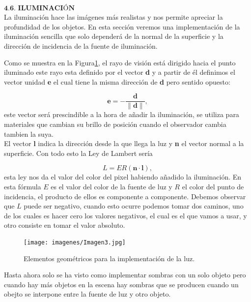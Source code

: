 ${ }$\\
$\textbf{4.6. ILUMINACIÓN}$
${ }$\\

La iluminación hace las imágenes más realistas y nos permite apreciar la profundidad de los objetos. En esta sección veremos una implementación de la iluminación sencilla que solo dependerá de la normal de la superficie y la dirección de incidencia de la fuente de iluminación. 


Como se muestra en la Figura\ref{fig:etiq_5}, el rayo de visión está dirigido hacia el punto iluminado este rayo esta definido por el vector \textbf{d} y a partir de él definimos el vector unidad \textbf{e} el cual tiene la misma dirección de \textbf{d} pero sentido opuesto:



\[
	\textbf{e} = - \frac{\textbf{d}}{\|\textbf{d}\|},
\]
este vector será prescindible a la hora de añadir la iluminación, se utiliza para materiales que cambian su brillo de posición cuando el observador cambia tambien la suya.
${ }$\\


El vector \textbf{l} indica la dirección desde la que llega la luz y \textbf{n} el vector normal a la superficie. Con todo esto la Ley de Lambert sería

\[
	L = ER(\textbf{n}\cdot \textbf{l}),
\]
esta ley nos da el valor del color del pixel habiendo añadido la iluminación. En esta fórmula $E$ es el valor del color de la fuente de luz y $R$ el color del punto de incidencia, el producto de ellos es componente a componente. Debemos observar que $L$ puede ser negativo, cuando esto ocurre podemos tomar dos caminos, uno de los cuales es hacer cero los valores negativos, el cual es el que vamos a usar, y otro consiste en tomar el valor absoluto.
	${ }$\\	


\begin{figure}
	\begin{center}
		\texttt{[image: imagenes/Imagen3.jpg]}
	\end{center}
	\caption{Elementos geométricos para la implementación de la luz.}
	\label{fig:etiq_5}
\end{figure}





Hasta ahora solo se ha visto como implementar sombras con un solo objeto pero cuando hay más objetos en la escena hay sombras que se producen cuando un obejto se interpone entre la fuente de luz y otro objeto.
	${ }$\\	
	
